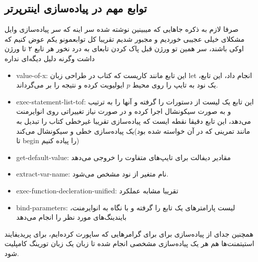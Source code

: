\documentclass{article}
\begin{document}
\subsection{توابع مهم در پیاده‌سازی اینترپرتر}
صرفا لازم به ذکره جاهایی که میبینین نوشته شده 
سر اینه که سر پیاده‌سازی وایل مشکلای خیلی عجیبی خوردیم و مجبور شدیم تقریبا کل توابعمونو یکم عوض کنیم که اوکی باشند، سر همین تو ورژن قبل پاک کردن تابعای به درد نخور 
هر تابع ۲ تا ورژن داشت وگرنه دلیل دیگه‌ای نداره
\begin{itemize}
        \item value-of-x: این تابع مانند کاریست که کتاب در طراحی زبان let انجام داد، این تابع، یک نود  به تایپ  را روی محیط $p$ ایولیویت کرده و نتیجه را بر می‌گرداند.
        \item exec-statement-list-tof: این تابع یک لیست از دستورات را گرفته و آنها را به ترتیب و به صورت سیکونشال اجرا کرده و در صورت نیاز تغییراتی روی انوایرمنت می‌دهد، این تابع دقیقا 
        نقطه ایست که پیاده‌سازی تقریبا غیرخطی کتاب را تبدیل به یک پیاده‌سازی خطی و سیکونشال می‌کند(مانند تمرینی که در آن خواسته شده بود تا begin را پیاده کنیم)
        \item get-default-value: مقادیر دیفالت برای تایپ‌های متفاوت را خروجی می‌دهد
        \item extract-var-name: نام متغیر از نود  مشخص می‌شود.
        \item exec-function-decleration-unified: تقریبا مشابه عملکرد 
        \item bind-parameters: لیست پارامتر‌های یک تابع را گرفته و با نگاه به انوایرمنت، بایندینگ‌های مورد نظر را انجام می‌دهد
\end{itemize}
همچنین جدای از پیاده‌سازی برای 
برای گرامر‌هایی که ساپورت کرده‌ایم، 
برای پریدیفایند استیتمنت‌ها هم هر یک پیاده‌سازی مشخصی انجام شده تا زبان یک زبان تورینگ کامپلیت شود.
\end{document}
